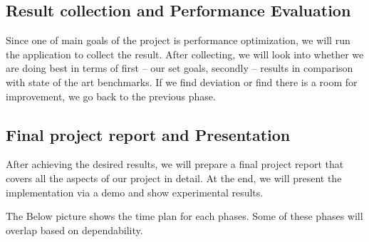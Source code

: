 \documentclass[titlepage]{report}
\begin{document}
\subsection{Result collection and Performance Evaluation}
Since one of main goals of the project is performance optimization, we will run the application to collect the result. After collecting, we will look into whether we are doing best in terms of first – our set goals, secondly – results in comparison with state of the art benchmarks. If we find deviation or find there is a room for improvement, we go back to the previous phase.

\subsection{Final project report and Presentation}
After achieving the desired results, we will prepare a final project report that covers all the aspects of our project in detail. At the end, we will present the implementation via a demo and show experimental results. 

The Below picture shows the time plan for each phases. Some of these phases will overlap based on dependability.
\end{document}
